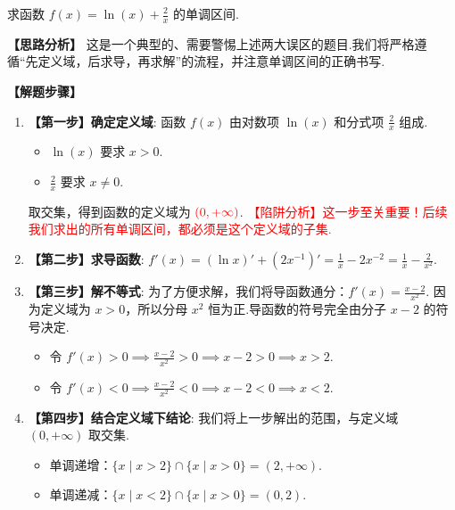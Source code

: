 \begin{exercise}[综合辨析题]
	求函数 $f(x) = \ln(x) + \frac{2}{x}$ 的单调区间.
\end{exercise}
\begin{solution}
	\textbf{【思路分析】}
	\textcolor{green!50!black}{这是一个典型的、需要警惕上述两大误区的题目.我们将严格遵循“先定义域，后求导，再求解”的流程，并注意单调区间的正确书写.}
	
	\textbf{【解题步骤】}
	\begin{enumerate}
		\item \textbf{【第一步】确定定义域}:
		函数 $f(x)$ 由对数项 $\ln(x)$ 和分式项 $\frac{2}{x}$ 组成.
		\begin{itemize}
			\item $\ln(x)$ 要求 $x > 0$.
			\item $\frac{2}{x}$ 要求 $x \neq 0$.
		\end{itemize}
		取交集，得到函数的定义域为 $\textcolor{red}{(0, +\infty)}$.
		\textcolor{red}{【陷阱分析】这一步至关重要！后续我们求出的所有单调区间，都必须是这个定义域的子集.}
		
		\item \textbf{【第二步】求导函数}:
		$f'(x) = (\ln x)' + (2x^{-1})' = \frac{1}{x} - 2x^{-2} = \frac{1}{x} - \frac{2}{x^2}$.
		
		\item \textbf{【第三步】解不等式}:
		为了方便求解，我们将导函数通分：$f'(x) = \frac{x-2}{x^2}$.
		因为定义域为 $x>0$，所以分母 $x^2$ 恒为正.导函数的符号完全由分子 $x-2$ 的符号决定.
		\begin{itemize}
			\item 令 $f'(x) > 0 \implies \frac{x-2}{x^2} > 0 \implies x-2 > 0 \implies x > 2$.
			\item 令 $f'(x) < 0 \implies \frac{x-2}{x^2} < 0 \implies x-2 < 0 \implies x < 2$.
		\end{itemize}
		
		\item \textbf{【第四步】结合定义域下结论}:
		我们将上一步解出的范围，与定义域 $(0, +\infty)$ 取交集.
		\begin{itemize}
			\item 单调递增：$\{x \mid x>2\} \cap \{x \mid x>0\} = (2, +\infty)$.
			\item 单调递减：$\{x \mid x<2\} \cap \{x \mid x>0\} = (0, 2)$.
		\end{itemize}
		

\end{enumerate}
\end{solution}
